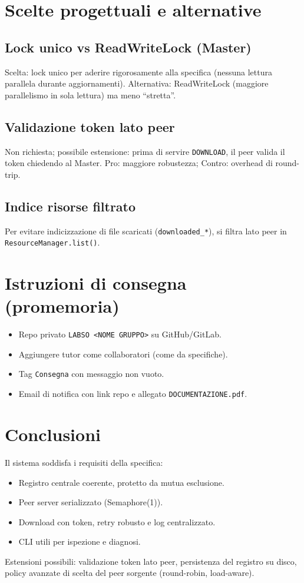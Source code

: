 \documentclass[a4paper,12pt]{article}
\begin{document}
\section{Scelte progettuali e alternative}
\subsection*{Lock unico vs ReadWriteLock (Master)}
Scelta: lock unico per aderire rigorosamente alla specifica (nessuna lettura parallela durante aggiornamenti). 
Alternativa: ReadWriteLock (maggiore parallelismo in sola lettura) ma meno “stretta”.

\subsection*{Validazione token lato peer}
Non richiesta; possibile estensione: prima di servire \texttt{DOWNLOAD}, il peer valida il token chiedendo al Master. Pro: maggiore robustezza; Contro: overhead di round-trip.

\subsection*{Indice risorse filtrato}
Per evitare indicizzazione di file scaricati (\texttt{downloaded\_*}), si filtra lato peer in \texttt{ResourceManager.list()}.

\section{Istruzioni di consegna (promemoria)}
\begin{itemize}[nosep]
  \item Repo privato \texttt{LABSO <NOME GRUPPO>} su GitHub/GitLab.
  \item Aggiungere tutor come collaboratori (come da specifiche).
  \item Tag \texttt{Consegna} con messaggio non vuoto.
  \item Email di notifica con link repo e allegato \texttt{DOCUMENTAZIONE.pdf}.
\end{itemize}

\section{Conclusioni}
Il sistema soddisfa i requisiti della specifica:
\begin{itemize}[nosep]
  \item Registro centrale coerente, protetto da mutua esclusione.
  \item Peer server serializzato (Semaphore(1)).
  \item Download con token, retry robusto e log centralizzato.
  \item CLI utili per ispezione e diagnosi.
\end{itemize}
Estensioni possibili: validazione token lato peer, persistenza del registro su disco, policy avanzate di scelta del peer sorgente (round-robin, load-aware).
\end{document}
